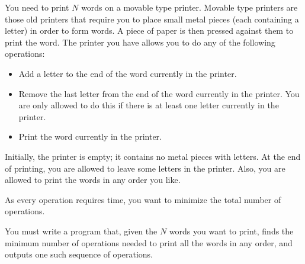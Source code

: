 You need to print $N$ words on a movable type printer. Movable type printers are those old printers that require you to place small metal pieces (each containing a letter) in order to form words. A piece of paper is then pressed against them to print the word. The printer you have allows you to do any of the following operations:
\begin{itemize}
\item Add a letter to the end of the word currently in the printer.
\item Remove the last letter from the end of the word currently in the printer. You are only allowed to do this if there is at least one letter currently in the printer.
\item Print the word currently in the printer.
\end{itemize}

Initially, the printer is empty; it contains no metal pieces with letters. At the end of printing, you are allowed to leave some letters in the printer. Also, you are allowed to print the words in any order you like.

As every operation requires time, you want to minimize the total number of operations.

You must write a program that, given the $N$ words you want to print, finds the minimum number of operations needed to print all the words in any order, and outputs one such sequence of operations.  